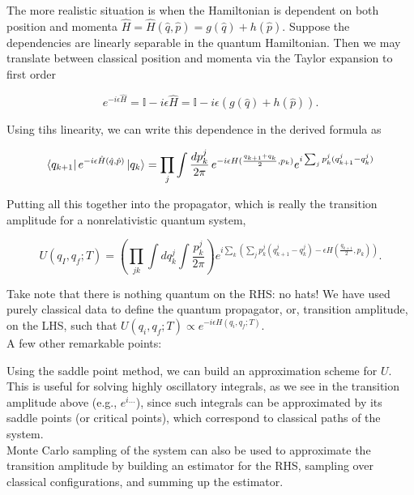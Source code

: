 \noindent The more realistic situation is when the Hamiltonian is dependent on both position and momenta $\hat{H} = \hat{H}(\hat{q}, \hat{p}) = g(\hat{q}) + h(\hat{p})$. Suppose the dependencies are linearly separable in the quantum Hamiltonian. Then we may translate between classical position and momenta via the Taylor expansion to first order

\begin{equation}
e^{-i \epsilon \hat{H}} = \mathbb{I} - i \epsilon \hat{H} = \mathbb{I} - i \epsilon (g(\hat{q}) + h(\hat{p})).
\end{equation}

\noindent Using tihs linearity, we can write this dependence in the derived formula as

\begin{equation}
\bra{q_{k+1}} e^{-i \epsilon \hat{H}(\hat{q}, \hat{p})} \ket{q_k} = \prod_j \int \frac{dp_k^j}{2\pi} \, e^{ -i \epsilon H (\frac{q_{k+1}+q_k}{2}, p_k)} e^{ i \sum_j p_k^j (q_{k+1}^j - q_k^j ) }
\end{equation}

\noindent Putting all this together into the propagator, which is really the transition amplitude for a nonrelativistic quantum system,

\begin{equation}
U(q_I, q_f; T) = \left(  \prod_{jk} \int dq_k^j \int \frac{p_k^j}{2\pi} \right) e^{i \sum_k \left( \sum_j p_k^j (q_{k+1}^j - q_k^j) - \epsilon H (\frac{q_{k+1}}{2}, p_k) \right)}.
\end{equation}

\noindent Take note that there is nothing quantum on the RHS: no hats! We have used purely classical data to define the quantum propagator, or, transition amplitude, on the LHS, such that $U(q_i, q_f; T) \propto e^{- i \epsilon H (q_i, q_f; T)}$. \\

\noindent A few other remarkable points:

\noindent Using the saddle point method, we can build an approximation scheme for $U$. This is useful for solving highly oscillatory integrals, as we see in the transition amplitude above (e.g., $e^{i\dots}$), since such integrals can be approximated by its saddle points (or critical points), which correspond to classical paths of the system. \\

\noindent Monte Carlo sampling of the system can also be used to approximate the transition amplitude by building an estimator for the RHS, sampling over classical configurations, and summing up the estimator. \\

